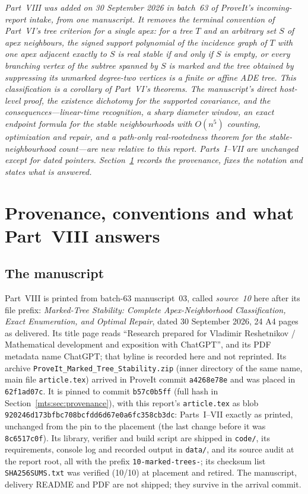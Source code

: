 \documentclass[11pt]{article}
\numberwithin{equation}{section}
\theoremstyle{definition}
\begin{document}
\noindent\emph{Part~VIII was added on 30 September 2026 in batch~63 of
ProveIt's incoming-report intake, from one manuscript. It removes the
terminal convention of Part~VI's tree criterion for a single apex: for a
tree $T$ and an arbitrary set $S$ of apex neighbours, the signed support
polynomial of the incidence graph of $T$ with one apex adjacent exactly to
$S$ is real stable if and only if $S$ is empty, or every branching vertex
of the subtree spanned by $S$ is marked and the tree obtained by
suppressing its unmarked degree-two vertices is a finite or affine ADE
tree. This classification is a corollary of Part~VI's theorems. The
manuscript's direct host-level proof, the existence dichotomy for the
supported covariance, and the consequences---linear-time recognition, a
sharp diameter window, an exact endpoint formula for the stable
neighbourhoods with $O(n^5)$ counting, optimization and repair, and a
path-only real-rootedness theorem for the stable-neighbourhood count---are
new relative to this report. Parts~I--VII are unchanged except for dated
pointers. Section~\ref{mts:sec:prov} records the provenance, fixes the
notation and states what is answered.}

\section{Provenance, conventions and what Part~VIII answers}
\label{mts:sec:prov}

\subsection{The manuscript}
\label{mts:sec:source}
Part~VIII is printed from batch-63 manuscript~03, called \emph{source~10}
here after its file prefix: \emph{Marked-Tree Stability: Complete
Apex-Neighborhood Classification, Exact Enumeration, and Optimal Repair},
dated 30 September 2026, 24 A4 pages as delivered. Its title page reads
``Research prepared for Vladimir Reshetnikov / Mathematical development and
exposition with ChatGPT'', and its PDF metadata name ChatGPT; that byline
is recorded here and not reprinted. Its archive
\nolinkurl{ProveIt_Marked_Tree_Stability.zip} (inner directory of the same
name, main file \nolinkurl{article.tex}) arrived in ProveIt commit
\texttt{a4268e78e} and was placed in \texttt{62f1ad07c}. It is pinned to
commit \texttt{b57c0b5ff} (full hash in Section~\ref{mts:sec:provenance}),
with this report's \texttt{article.tex} as blob
\texttt{920246d173bfbc708bcf\allowbreak dd6d67e0a6fc358cb3dc}: Parts~I--VII
exactly as printed, unchanged from the pin to the placement (the last
change before it was \texttt{8c6517c0f}). Its library, verifier and build
script are shipped in \nolinkurl{code/}, its requirements, console log and
recorded output in \nolinkurl{data/}, and its source audit at the report
root, all with the prefix \texttt{10-marked-trees-}; its checksum list
\texttt{SHA256SUMS.txt} was verified (10/10) at placement and retired. The
manuscript, delivery README and PDF are not shipped; they survive in the
arrival commit.
\end{document}
